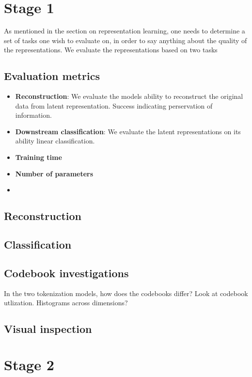 \documentclass[../../thesis.tex]{subfiles}
\begin{document}
\section{Stage 1}

As mentioned in the section on representation learning, one needs to determine a set of tasks one wish to evaluate on, in order to say anything about the quality of the representations. We evaluate the representations based on two tasks

\subsection{Evaluation metrics}

\begin{itemize}
    \item \textbf{Reconstruction}: We evaluate the models ability to reconstruct the original data from latent representation. Success indicating perservation of information.
    \item \textbf{Downstream classification}: We evaluate the latent representations on its ability linear classification. 
    \item \textbf{Training time}
    \item \textbf{Number of parameters}
    \item 
\end{itemize}

\subsection{Reconstruction}

\subsection{Classification}

\subsection{Codebook investigations}

In the two tokenization models, how does the codebooks differ? Look at codebook utlization. Histograms across dimensions?  

\subsection{Visual inspection}
\section{Stage 2}
\end{document}

